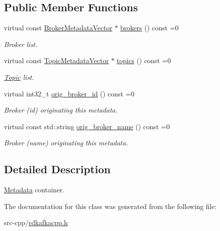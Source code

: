 \subsection*{Public Member Functions}
\begin{DoxyCompactItemize}
\item 
\hypertarget{classRdKafka_1_1Metadata_a5a22e460d2734348a0b392b8557087c1}{
virtual const \hyperlink{classRdKafka_1_1Metadata_a965c9ca825ca6334df81f397b43711af}{BrokerMetadataVector} $\ast$ \hyperlink{classRdKafka_1_1Metadata_a5a22e460d2734348a0b392b8557087c1}{brokers} () const =0}
\label{classRdKafka_1_1Metadata_a5a22e460d2734348a0b392b8557087c1}

\begin{DoxyCompactList}\small\item\em Broker list. \item\end{DoxyCompactList}\item 
\hypertarget{classRdKafka_1_1Metadata_a0c0e4915aa64843bcb585d84090911a1}{
virtual const \hyperlink{classRdKafka_1_1Metadata_a297b2b875e4e7a68ffc1c0b1fc03fa05}{TopicMetadataVector} $\ast$ \hyperlink{classRdKafka_1_1Metadata_a0c0e4915aa64843bcb585d84090911a1}{topics} () const =0}
\label{classRdKafka_1_1Metadata_a0c0e4915aa64843bcb585d84090911a1}

\begin{DoxyCompactList}\small\item\em \hyperlink{classRdKafka_1_1Topic}{Topic} list. \item\end{DoxyCompactList}\item 
\hypertarget{classRdKafka_1_1Metadata_a1c54bbc1d53845a168ba0373a2665b33}{
virtual int32\_\-t \hyperlink{classRdKafka_1_1Metadata_a1c54bbc1d53845a168ba0373a2665b33}{orig\_\-broker\_\-id} () const =0}
\label{classRdKafka_1_1Metadata_a1c54bbc1d53845a168ba0373a2665b33}

\begin{DoxyCompactList}\small\item\em Broker (id) originating this metadata. \item\end{DoxyCompactList}\item 
\hypertarget{classRdKafka_1_1Metadata_a88b43b6f9282dabef7de5af8004a5931}{
virtual const std::string \hyperlink{classRdKafka_1_1Metadata_a88b43b6f9282dabef7de5af8004a5931}{orig\_\-broker\_\-name} () const =0}
\label{classRdKafka_1_1Metadata_a88b43b6f9282dabef7de5af8004a5931}

\begin{DoxyCompactList}\small\item\em Broker (name) originating this metadata. \item\end{DoxyCompactList}\end{DoxyCompactItemize}


\subsection{Detailed Description}
\hyperlink{classRdKafka_1_1Metadata}{Metadata} container. 

The documentation for this class was generated from the following file:\begin{DoxyCompactItemize}
\item 
src-\/cpp/\hyperlink{rdkafkacpp_8h}{rdkafkacpp.h}\end{DoxyCompactItemize}
